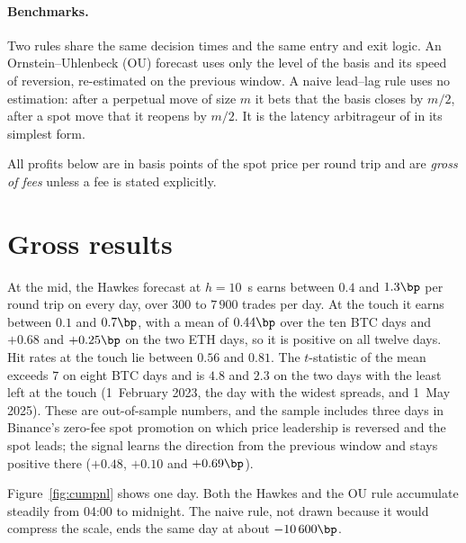 \documentclass[a4paper,11pt]{article}
\begin{document}
\paragraph{Benchmarks.} Two rules share the same decision times and the same entry and exit logic. An Ornstein--Uhlenbeck (OU) forecast uses only the level of the basis and its speed of reversion, re-estimated on the previous window. A naive lead--lag rule uses no estimation: after a perpetual move of size $m$ it bets that the basis closes by $m/2$, after a spot move that it reopens by $m/2$. It is the latency arbitrageur of \cite{budish2015} in its simplest form.

All profits below are in basis points of the spot price per round trip and are \emph{gross of fees} unless a fee is stated explicitly.

\section{Gross results}

At the mid, the Hawkes forecast at $h = 10$~s earns between $0.4$ and $1.3\bp$ per round trip on every day, over $300$ to $7\,900$ trades per day. At the touch it earns between $0.1$ and $0.7\bp$, with a mean of $0.44\bp$ over the ten BTC days and $+0.68$ and $+0.25\bp$ on the two ETH days, so it is positive on all twelve days. Hit rates at the touch lie between $0.56$ and $0.81$. The $t$-statistic of the mean exceeds $7$ on eight BTC days and is $4.8$ and $2.3$ on the two days with the least left at the touch (1~February 2023, the day with the widest spreads, and 1~May 2025). These are out-of-sample numbers, and the sample includes three days in Binance's zero-fee spot promotion on which price leadership is reversed and the spot leads; the signal learns the direction from the previous window and stays positive there ($+0.48$, $+0.10$ and $+0.69\bp$).

Figure~\ref{fig:cumpnl} shows one day. Both the Hawkes and the OU rule accumulate steadily from 04:00 to midnight. The naive rule, not drawn because it would compress the scale, ends the same day at about $-10\,600\bp$.
\end{document}
